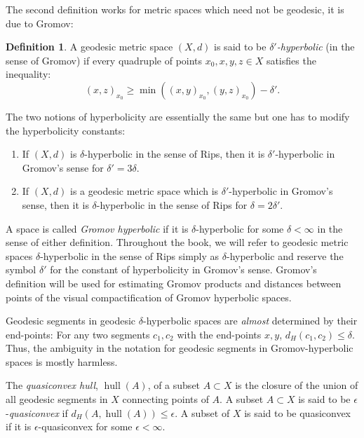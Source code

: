 \documentclass[12pt]{amsbook}%
\theoremstyle{definition}
\newtheorem{defi}[thm]{Definition}
\theoremstyle{remark}
\numberwithin{section}{chapter}
\numberwithin{subsection}{section}
\numberwithin{figure}{chapter}
\DeclareMathOperator{\hull}{hull}
\def\eps{\epsilon}
\begin{document}
The second definition works for metric spaces which need not be geodesic, it is due to Gromov:

\begin{defi}
A geodesic metric space $(X,d)$ is said to be {\em $\delta'$-hyperbo\-lic} (in the sense of Gromov) if every  quadruple of points $x_0, x, y, z\in X$ satisfies the inequality:
\begin{equation}\label{eq:Gh}
(x,z)_{x_0}\geqslant \min \left( (x,y)_{x_0}, (y,z)_{x_0}\right) - \delta'. 
\end{equation}
\end{defi}

The two notions of hyperbolicity are essentially the same but one has to modify the hyperbolicity constants:

\begin{enumerate}
\item If $(X,d)$ is $\delta$-hyperbolic in the sense of Rips, then it is $\delta'$-hyperbolic in Gromov's sense for $\delta'=3\delta$. 

\item If $(X,d)$ is a geodesic metric space which is $\delta'$-hyperbolic in Gromov's sense, then it is $\delta$-hyperbolic in the sense of Rips for $\delta=2\delta'$. 
\end{enumerate} 

 A space is called {\em Gromov hyperbolic} 
 if it is $\delta$-hyperbolic for some $\delta<\infty$ in the sense of either definition.  
 Throughout the book, we will refer to geodesic metric spaces $\delta$-hyperbolic in the sense of Rips 
simply as $\delta$-hyperbolic and reserve the symbol $\delta'$ for the constant of 
hyperbolicity in Gromov's sense. Gromov's definition will be used for estimating 
Gromov products and distances between points of the visual compactification of 
Gromov hyperbolic spaces. 


Geodesic segments in geodesic $\delta$-hyperbolic spaces are {\em almost} determined by their end-points: For any two segments $c_1, c_2$ with the end-points $x, y$, $d_H(c_1, c_2)\leqslant \delta$. Thus, the ambiguity in the notation for geodesic segments in Gromov-hyperbolic spaces is mostly harmless. 

\medskip 
The {\em quasiconvex hull}, \index{$\hull(A)$, quasiconvex hull} 
$\hull(A)$, of a subset $A\subset X$ is the closure of the union of all geodesic segments in $X$ connecting points of $A$. 
A subset $A\subset X$ is said to be $\eps$-{\em quasiconvex}  if $d_H(A, \hull(A))\leqslant \eps$. A subset of $X$ is said to be quasiconvex if it is $\eps$-quasiconvex for some $\eps<\infty$.  
\end{document}

